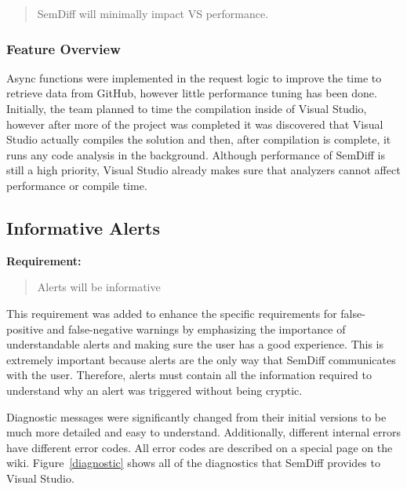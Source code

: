 \documentclass[draftclsnofoot,onecolumn]{IEEEtran}
\begin{document}
\begin{quote}

SemDiff will minimally impact VS performance.

\end{quote}

\subsubsection{Feature Overview}


Async functions were implemented in the request logic to improve the time to retrieve data from GitHub, however little performance tuning has been done. Initially, the team planned to time the compilation inside of Visual Studio, however after more of the project was completed it was discovered that Visual 
Studio actually compiles the solution and then, after compilation is complete, it runs any code analysis in the background. Although performance of SemDiff is still a high priority, Visual Studio already makes sure that analyzers cannot affect performance or compile time. 

\subsection{Informative Alerts}%

\textbf{Requirement:}

\begin{quote}

Alerts will be informative

\end{quote}


This requirement was added to enhance the specific requirements for false-positive and false-negative warnings by emphasizing the importance of understandable alerts and making sure the user has a good experience. This is extremely important because alerts are the only way that SemDiff communicates 
with the user. Therefore, alerts must contain all the information required to understand why an alert was triggered without being cryptic.

Diagnostic messages were significantly changed from their initial versions to be much more detailed and easy to understand. Additionally, different internal errors have different error codes. All error codes are described on a special page on the wiki. Figure~\ref{diagnostic} shows all of the diagnostics that SemDiff provides to Visual Studio.
\end{document}
